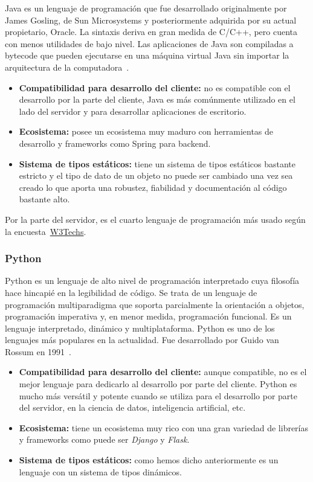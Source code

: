 Java es un lenguaje de programación que fue desarrollado originalmente por James Gosling, de Sun Microsystems y posteriormente adquirida por su actual propietario, Oracle. La sintaxis deriva en gran medida de C/C++, pero cuenta con menos utilidades de bajo nivel. Las aplicaciones de Java son compiladas a bytecode que pueden ejecutarse en una máquina virtual Java sin importar la arquitectura de la computadora~\cite{java-wiki}.

\begin{itemize}
    \item[\mal] \textbf{Compatibilidad para desarrollo del cliente:} no es compatible con el desarrollo por la parte del cliente, Java es más comúnmente utilizado en el lado del servidor y para desarrollar aplicaciones de escritorio. 
    \item[\bien] \textbf{Ecosistema:} posee un ecosistema muy maduro con herramientas de desarrollo y frameworks como Spring para backend.
    \item[\esp] \textbf{Sistema de tipos estáticos:} tiene un sistema de tipos estáticos bastante estricto y el tipo de dato de un objeto no puede ser cambiado una vez sea creado lo que aporta una robustez, fiabilidad y documentación al código bastante alto.
\end{itemize}

Por la parte del servidor, es el cuarto lenguaje de programación más usado según la encuesta~\href{https://w3techs.com/technologies/overview/programming_language}{W3Techs}.

\subsubsection{Python}

Python es un lenguaje de alto nivel de programación interpretado cuya filosofía hace hincapié en la legibilidad de código. Se trata de un lenguaje de programación multiparadigma que soporta parcialmente la orientación a objetos, programación imperativa y, en menor medida, programación funcional. Es un lenguaje interpretado, dinámico y multiplataforma. Python es uno de los lenguajes más populares en la actualidad. Fue desarrollado por Guido van Rossum en 1991~\cite{python-wiki}.

\begin{itemize}
    \item[\mal] \textbf{Compatibilidad para desarrollo del cliente:} aunque compatible, no es el mejor lenguaje para dedicarlo al desarrollo por parte del cliente. Python es mucho más versátil y potente cuando se utiliza para el desarrollo por parte del servidor, en la ciencia de datos, inteligencia artificial, etc.
    \item[\bien] \textbf{Ecosistema:} tiene un ecosistema muy rico con una gran variedad de librerías y frameworks como puede ser \textit{Django} y \textit{Flask}.
    \item[\mal] \textbf{Sistema de tipos estáticos:} como hemos dicho anteriormente es un lenguaje con un sistema de tipos dinámicos.
\end{itemize}

